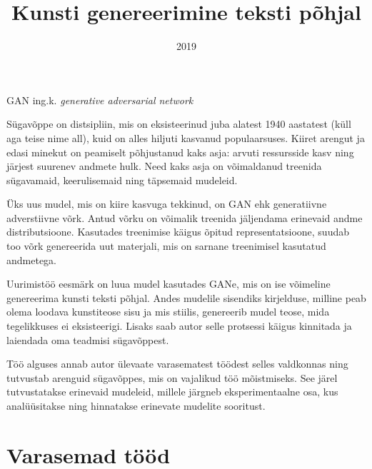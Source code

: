 \documentclass{vilgym}
\title{Kunsti genereerimine teksti põhjal}
\date{2019}
\begin{document}
	\maketitle
	\tableofcontents

	\begin{description}
		\let\originalitem\item
		\renewcommand*{\item}[1][]{\originalitem[#1]\label{def:#1}}

		\item{GAN} ing.k. \textit{generative adversarial network}
	\end{description}

	\newcommand*{\seedefinition}[1]{(\hyperref[def:#1]{vt~definitsiooni})}
	\newcommand*{\ingk}[1]{(\textit{ing. k. #1})}

	Sügavõppe on distsipliin, mis on eksisteerinud juba alatest 1940 aastatest (küll aga teise nime all), kuid on alles hiljuti kasvanud populaarsuses. Kiiret arengut ja edasi minekut on peamiselt põhjustanud kaks asja: arvuti ressursside kasv ning järjest suurenev andmete hulk. Need kaks asja on võimaldanud treenida sügavamaid, keerulisemaid ning täpsemaid mudeleid. \parencite{deeplearningbook}	 

	Üks uus mudel, mis on kiire kasvuga tekkinud, on GAN ehk generatiivne adverstiivne võrk. Antud võrku on võimalik treenida jäljendama erinevaid andme distributsioone. Kasutades treenimise käigus õpitud representatsioone, suudab too võrk genereerida uut materjali, mis on sarnane treenimisel kasutatud andmetega. \parencite{gan}

	Uurimistöö eesmärk on luua mudel kasutades GANe, mis on ise võimeline genereerima kunsti teksti põhjal. Andes mudelile sisendiks kirjelduse, milline peab olema loodava kunstiteose sisu ja mis stiilis, genereerib mudel teose, mida tegelikkuses ei eksisteerigi. Lisaks saab autor selle protsessi käigus kinnitada ja laiendada oma teadmisi sügavõppest.

	Töö alguses annab autor ülevaate varasematest töödest selles valdkonnas ning tutvustab arenguid sügavõppes, mis on vajalikud töö mõistmiseks. See järel tutvustatakse erinevaid mudeleid, millele järgneb eksperimentaalne osa, kus analüüsitakse ning hinnatakse erinevate mudelite sooritust. 
	
	\section{Varasemad tööd}
\end{document}
